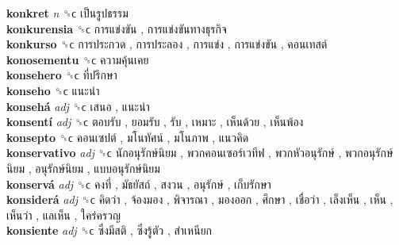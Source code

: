 \textbf{konkret} \emph{n}  ␝ϲ   เป็นรูปธรรม   \\
\textbf{konkurensia} ␝ϲ   การแข่งขัน ,  การแข่งขันทางธุรกิจ   \\
\textbf{konkurso} ␝ϲ   การประกวด ,  การประลอง ,  การแข่ง ,  การแข่งขัน ,  คอนเทสต์   \\
\textbf{konosementu} ␝ϲ   ความคุ้นเคย   \\
\textbf{konsehero} ␝ϲ   ที่ปรึกษา   \\
\textbf{konseho} ␝ϲ   แนะนำ   \\
\textbf{konsehá} \emph{adj}  ␝ϲ   เสนอ ,  แนะนำ   \\
\textbf{konsentí} \emph{adj}  ␝ϲ   ตอบรับ ,  ยอมรับ ,  รับ ,  เหมาะ ,  เห็นด้วย ,  เห็นพ้อง   \\
\textbf{konsepto} ␝ϲ   คอนเซปต์ ,  มโนทัศน์ ,  มโนภาพ ,  แนวคิด   \\
\textbf{konservativo} \emph{adj}  ␝ϲ   นักอนุรักษ์นิยม ,  พวกคอนเซอร์เวทีฟ ,  พวกหัวอนุรักษ์ ,  พวกอนุรักษ์นิยม ,  อนุรักษ์นิยม ,  แบบอนุรักษ์นิยม   \\
\textbf{konservá} \emph{adj}  ␝ϲ   คงที่ ,  มัธยัสถ์ ,  สงวน ,  อนุรักษ์ ,  เก็บรักษา   \\
\textbf{konsiderá} \emph{adj}  ␝ϲ   คิดว่า ,  จ้องมอง ,  พิจารณา ,  มองออก ,  ศึกษา ,  เชื่อว่า ,  เล็งเห็น ,  เห็น ,  เห็นว่า ,  แลเห็น ,  ใคร่ครวญ   \\
\textbf{konsiente} \emph{adj}  ␝ϲ   ซึ่งมีสติ ,  ซึ่งรู้ตัว ,  สำเหนียก   \\
